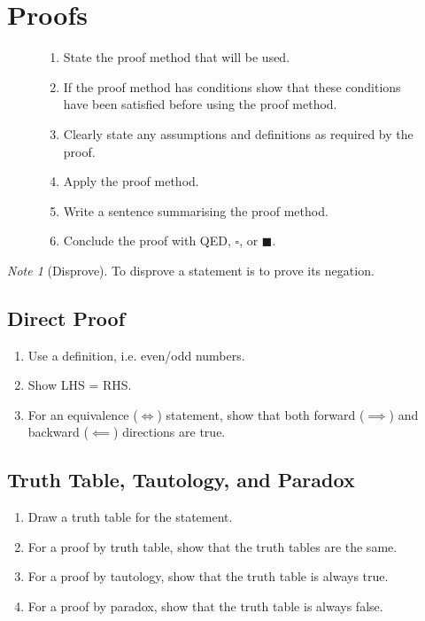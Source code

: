 \documentclass{article}
\theoremstyle{plain}
\numberwithin{theorem}{subsection}
\theoremstyle{definition}
\numberwithin{definition}{subsection}
\theoremstyle{remark}
\newtheorem{note}{Note}[section]
\numberwithin{note}{subsection}
\begin{document}
\section{Proofs}
\begin{figure}[H]
	\begin{mdframed}[style=exampledefault,frametitle={Proof Structure}]
		\begin{enumerate}[leftmargin=3.5em, itemsep=0.2em, topsep=0.35em]
			\item State the proof method that will be used.
			\item If the proof method has conditions show that these conditions have been satisfied before using the proof method.
			\item Clearly state any assumptions and definitions as required by the proof.
			\item Apply the proof method.
			\item Write a sentence summarising the proof method.
			\item Conclude the proof with QED, $\square$, or $\blacksquare$.
		\end{enumerate}
	\end{mdframed}
\end{figure}
%
\begin{note}[Disprove]
    To disprove a statement is to prove its negation.
\end{note}
%
\subsection{Direct Proof}
\begin{enumerate}
    \item Use a definition, i.e. even/odd numbers.
    \item Show LHS = RHS.
    \item For an equivalence ($\iff$) statement, show that both forward ($\implies$) and backward ($\impliedby$) directions are true.
\end{enumerate}
%
\subsection{Truth Table, Tautology, and Paradox}
\begin{enumerate}
    \item Draw a truth table for the statement.
    \item For a proof by truth table, show that the truth tables are the same.
    \item For a proof by tautology, show that the truth table is always true.
    \item For a proof by paradox, show that the truth table is always false.
\end{enumerate}
%
\end{document}
